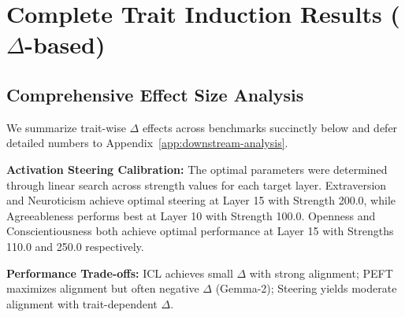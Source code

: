 \section{Complete Trait Induction Results (\(\Delta\)-based)}
\label{app:trait-results}

\subsection{Comprehensive Effect Size Analysis}

We summarize trait-wise \(\Delta\) effects across benchmarks succinctly below and defer detailed numbers to Appendix~\ref{app:downstream-analysis}.

\textbf{Activation Steering Calibration:} The optimal parameters were determined through linear search across strength values for each target layer. Extraversion and Neuroticism achieve optimal steering at Layer 15 with Strength 200.0, while Agreeableness performs best at Layer 10 with Strength 100.0. Openness and Conscientiousness both achieve optimal performance at Layer 15 with Strengths 110.0 and 250.0 respectively.

\textbf{Performance Trade-offs:} ICL achieves small \(\Delta\) with strong alignment; PEFT maximizes alignment but often negative \(\Delta\) (Gemma-2); Steering yields moderate alignment with trait-dependent \(\Delta\).
